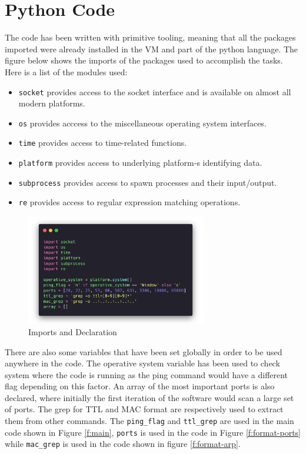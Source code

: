 \section{Python Code}
\label{s:lab2-python-code}
The code has been written with primitive tooling, meaning that all the packages
imported were already installed in the VM and part of the python language. The
figure below shows the imports of the packages used to accomplish the tasks.
Here is a list of the modules used:
\begin{itemize}
  \item \lstinline{socket} provides access to the socket interface and is available on almost all modern platforms.
  \item \lstinline{os} provides acccess to the miscellaneous operating system interfaces.
  \item \lstinline{time} provides access to time-related functions.
  \item \lstinline{platform} provides access to underlying platform-s identifying data.
  \item \lstinline{subprocess} provides access to spawn processes and their input/output.
  \item \lstinline{re} provides access to regular expression matching operations.
\end{itemize}
\begin{figure}[H]
  \centering
  \includegraphics[width=0.7\textwidth]{figures/code/imports}
  \caption{Imports and Declaration}
  \label{f:imports-declarations}
\end{figure}

There are also some variables that have been set globally in order to be used
anywhere in the code. The operative system variable has been used to check
system where the code is running as the ping command would have a different flag
depending on this factor. An array of the most important ports is also declared,
where initially the first iteration of the software would scan a large set of
ports. The grep for TTL and MAC format are respectively used to extract them
from other commands. The \lstinline{ping_flag} and \lstinline{ttl_grep} are used in the main code
shown in Figure \ref{f:main}, \lstinline{ports} is used in the code in Figure
\ref{f:format-ports} while \lstinline{mac_grep} is used in the code shown in
figure \ref{f:format-arp}.

